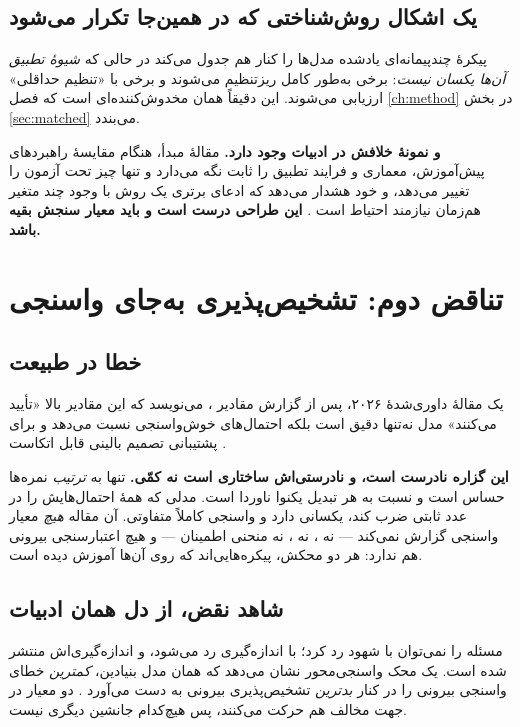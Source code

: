 \subsection{یک اشکال روش‌شناختی که در همین‌جا تکرار می‌شود}

پیکرهٔ چندپیمانه‌ای یادشده مدل‌ها را کنار هم جدول می‌کند در حالی که \emph{شیوهٔ تطبیق آن‌ها
یکسان نیست}: برخی به‌طور کامل ریزتنظیم می‌شوند و برخی با «تنظیم حداقلی» ارزیابی می‌شوند. این
دقیقاً همان مخدوش‌کننده‌ای است که فصل \ref{ch:method} در بخش \ref{sec:matched} می‌بندد.

\textbf{و نمونهٔ خلافش در ادبیات وجود دارد.} مقالهٔ مبدأ، هنگام مقایسهٔ راهبردهای پیش‌آموزش،
معماری و فرایند تطبیق را ثابت نگه می‌دارد و تنها چیز تحت آزمون را تغییر می‌دهد، و خود هشدار
می‌دهد که ادعای برتری یک روش با وجود چند متغیر هم‌زمان نیازمند احتیاط است
\cite{zhou2023retfound}. \textbf{این طراحی درست است و باید معیار سنجش بقیه باشد.}

\section{تناقض دوم: تشخیص‌پذیری به‌جای واسنجی}
\label{sec:contradiction2}

\subsection{خطا در طبیعت}

یک مقالهٔ داوری‌شدهٔ \num{۲۰۲۶}، پس از گزارش مقادیر ، می‌نویسد که این مقادیر بالا «تأیید
می‌کنند» مدل نه‌تنها دقیق است بلکه احتمال‌های خوش‌واسنجی نسبت می‌دهد و برای پشتیبانی تصمیم
بالینی قابل اتکاست \cite{yu2026dualswinord}.

\textbf{این گزاره نادرست است، و نادرستی‌اش ساختاری است نه کمّی.}  تنها به
\emph{ترتیب} نمره‌ها حساس است و نسبت به هر تبدیل یکنوا ناوردا است. مدلی که همهٔ احتمال‌هایش را
در عدد ثابتی ضرب کند،  یکسانی دارد و واسنجی کاملاً متفاوتی. آن مقاله \emph{هیچ} معیار
واسنجی گزارش نمی‌کند — نه ، نه ، نه منحنی اطمینان — و هیچ اعتبارسنجی بیرونی
هم ندارد: هر دو محکش، پیکره‌هایی‌اند که روی آن‌ها آموزش دیده است.

\subsection{شاهد نقض، از دل همان ادبیات}

مسئله را نمی‌توان با شهود رد کرد؛ با اندازه‌گیری رد می‌شود، و اندازه‌گیری‌اش منتشر شده است. یک
محک واسنجی‌محور نشان می‌دهد که همان مدل بنیادین، \emph{کمترین} خطای واسنجی بیرونی را در کنار
\emph{بدترین} تشخیص‌پذیری بیرونی به دست می‌آورد \cite{poyrazer2026calibration}. دو معیار در
جهت مخالف هم حرکت می‌کنند، پس هیچ‌کدام جانشین دیگری نیست.

